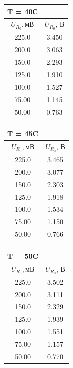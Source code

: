 \begin{minipage}{.3\textwidth}
\begin{center}
\begin{tabular}{|c|c|}
\hline
T = 40С&\\
\hline
$U_{R_0}, мВ$ \linebreak &$U_{R_0}$, \linebreak В\\
\hline
225.0&3.450\\
\hline
200.0&3.063\\
\hline
150.0&2.293\\
\hline
125.0&1.910\\
\hline
100.0&1.527\\
\hline
75.00&1.145\\
\hline
50.00&0.763\\
\hline
	\end{tabular}
	\end{center}
\end{minipage}%
\begin{minipage}{.3\textwidth}
\begin{center}
\begin{tabular}{|c|c|}
\hline
T = 45C&\\
\hline
$U_{R_0}, мВ$&$U_{R_0}$, \linebreak В \\
\hline
225.0&3.465\\
\hline
200.0&3.077\\
\hline
150.0&2.303\\
\hline
125.0&1.918\\
\hline
100.0&1.534\\
\hline
75.00&1.150\\
\hline
50.00&0.766\\
\hline
\end{tabular}
\end{center}

\end{minipage}
\begin{minipage}{.3\textwidth}
	\begin{center}
	\begin{tabular}{|c|c|}
	\hline
	T = 50C&\\
	\hline
	$U_{R_0}, мВ$&$U_{R_0}$, \linebreak В \\
	\hline
225.0&3.502\\
\hline
200.0&3.111\\
\hline
150.0&2.329\\
\hline
125.0&1.939\\
\hline
100.0&1.551\\
\hline
75.00&1.157\\
\hline
50.00&0.770\\
\hline
	\end{tabular}
	\end{center}

\end{minipage}

